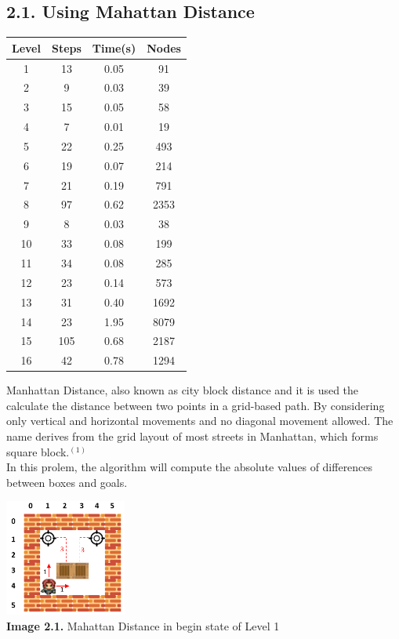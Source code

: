 \documentclass[english, a4paper,12pt]{article}
\begin{document}
\subsection*{2.1. Using Mahattan Distance}
\small\begin{minipage}{.35\textwidth}
\begin{tabular}{|c|c|c|c|}
\hline
Level & Steps & Time(s) & Nodes \\
\hline
1 & 13 & 0.05 & 91 \\
2 & 9 & 0.03 & 39 \\
3 & 15 & 0.05 & 58 \\
4 & 7 & 0.01 & 19 \\
5 & 22 & 0.25 & 493 \\
6 & 19 & 0.07 & 214 \\
7 & 21 & 0.19 & 791 \\
8 & 97 & 0.62 & 2353 \\
9 & 8 & 0.03 & 38 \\
10 & 33 & 0.08 & 199 \\
11 & 34 & 0.08 & 285 \\
12 & 23 & 0.14 & 573 \\
13 & 31 & 0.40 & 1692 \\
14 & 23 & 1.95 & 8079 \\
15 & 105 & 0.68 & 2187 \\
16 & 42 & 0.78 & 1294 \\
\hline
\end{tabular}
\end{minipage}
\begin{minipage}{.7\textwidth}
\hspace*{5mm}Manhattan  Distance,  also  known  as  city  block distance  and  it  is  used  the  calculate  the  distance  between two points in a grid-based path. By considering only vertical and  horizontal  movements  and  no  diagonal  movement allowed.  The  name  derives  from  the  grid  layout  of  most streets in Manhattan, which forms square block.$^{(1)}$ \\
\hspace*{5mm}In this prolem, the algorithm will compute the absolute values of differences between boxes and goals.

\hspace*{35mm}\includegraphics[width=4cm]{Level1_mah.png}\\
\hspace*{10mm}\textbf{Image 2.1.} Mahattan Distance in begin state of Level 1
\end{minipage}
\end{document}
